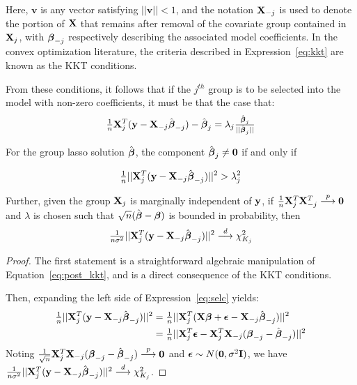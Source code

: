 Here, $\mathbf{v}$ is any vector satisfying $||\mathbf{v}|| < 1$, and the notation $\mathbf{X}_{-j}$ is used to denote the portion of $\mathbf{X}$ that remains after removal of the covariate group contained in $\mathbf{X}_j$, with $\boldsymbol{\beta}_{-j}$ respectively describing the associated model coefficients. In the convex optimization literature, the criteria described in Expression~\ref{eq:kkt} are known as the KKT conditions. 

From these conditions, it follows that if the $j^{th}$ group is to be selected into the model with non-zero coefficients, it must be that the case that:
\begin{equation}
\label{eq:post_kkt}
\tfrac{1}{n}\mathbf{X}_j^T(\mathbf{y} - \mathbf{X}_{-j}\hat{\boldsymbol{\beta}}_{-j}) - \hat{\boldsymbol{\beta}}_j = \lambda_j\tfrac{\hat{\boldsymbol{\beta}}_j}{||\hat{\boldsymbol{\beta}}_j||}
\end{equation}

\begin{theorem}
\label{Thm:main}
For the group lasso solution $\hat{\boldsymbol{\beta}}$, the component $\hat{\boldsymbol{\beta}}_j \ne \mathbf{0}$ if and only if

\begin{equation}
\label{eq:selc}
\tfrac{1}{n}||\mathbf{X}_j^T(\mathbf{y} - \mathbf{X}_{-j}\hat{\boldsymbol{\beta}}_{-j})||^2 > \lambda_j^2
\end{equation}

Further, given the group $\mathbf{X}_j$ is marginally independent of $\mathbf{y}$, if $\tfrac{1}{n}\mathbf{X}_j^T \mathbf{X}_{-j}^T \overset{p}{\longrightarrow} \mathbf{0}$ and $\lambda$ is chosen such that $\sqrt{n}(\hat{\boldsymbol{\beta}} - \boldsymbol{\beta})$ is bounded in probability, then
\begin{equation}
\label{eq:thm1}
\tfrac{1}{n \sigma^2}||\mathbf{X}_j^T(\mathbf{y} - \mathbf{X}_{-j}\hat{\boldsymbol{\beta}}_{-j})||^2 \overset{d}{\longrightarrow} \chi^2_{K_j}
\end{equation}
\end{theorem}

\begin{proof}
The first statement is a straightforward algebraic manipulation of Equation~\ref{eq:post_kkt}, and is a direct consequence of the KKT conditions. 

Then, expanding the left side of Expression~\ref{eq:selc} yields:
\begin{align}
\begin{alignedat}{2}
\tfrac{1}{n}||\mathbf{X}_j^T(\mathbf{y} - \mathbf{X}_{-j}\hat{\boldsymbol{\beta}}_{-j})||^2 &= \tfrac{1}{n}||\mathbf{X}_j^T(\mathbf{X}\boldsymbol{\beta} + \boldsymbol{\epsilon} - \mathbf{X}_{-j}\hat{\boldsymbol{\beta}}_{-j})||^2 \\
&= \tfrac{1}{n}||\mathbf{X}_j^T\boldsymbol{\epsilon} - \mathbf{X}_j^T\mathbf{X}_{-j}(\boldsymbol{\beta}_{-j} - \hat{\boldsymbol{\beta}}_{-j})||^2 
\end{alignedat}
\end{align}
Noting $\tfrac{1}{\sqrt{n}} \mathbf{X}_j^T\mathbf{X}_{-j}(\boldsymbol{\beta}_{-j} - \hat{\boldsymbol{\beta}}_{-j}) \overset{p}{\longrightarrow} \mathbf{0}$ and $\boldsymbol{\epsilon} \sim N(\mathbf{0},\sigma^2\mathbf{I})$, we have $\tfrac{1}{n \sigma^2}||\mathbf{X}_j^T(\mathbf{y} - \mathbf{X}_{-j}\hat{\boldsymbol{\beta}}_{-j})||^2 \overset{d}{\longrightarrow} \chi^2_{K_j}$.
\end{proof}

